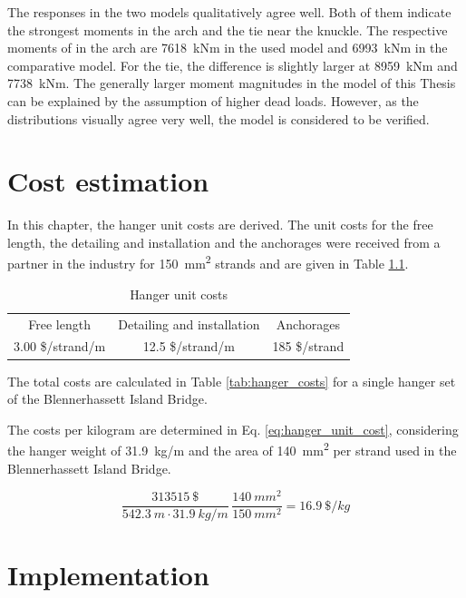 The responses in the two models qualitatively agree well. Both of them indicate the strongest moments in the arch and the tie near the knuckle. The respective moments of in the arch are \SI{7618}{kNm} in the used model and \SI{6993}{kNm} in the comparative model. For the tie, the difference is slightly larger at \SI{8959}{kNm} and \SI{7738}{kNm}. The generally larger moment magnitudes in the model of this Thesis can be explained by the assumption of higher dead loads. However, as the distributions visually agree very well, the model is considered to be verified.


\chapter{Cost estimation}
In this chapter, the hanger unit costs are derived. The unit costs for the free length, the detailing and installation and the anchorages were received from a partner in the industry for \SI{150}{mm^2} strands and are given in Table \ref{tab:hanger_unit}.

\begin{table}[H]
\centering
\begin{tabular}{ccc}
\hline
Free length      & Detailing and installation & Anchorages    \\
3.00 \$/strand/m & 12.5 \$/strand/m           & 185 \$/strand \\ \hline
\end{tabular}
\caption{Hanger unit costs}
\label{tab:hanger_unit}
\end{table}

The total costs are calculated in Table \ref{tab:hanger_costs} for a single hanger set of the Blennerhassett Island Bridge. 



The costs per kilogram are determined in Eq. \ref{eq:hanger_unit_cost}, considering the hanger weight of \SI{31.9}{kg/m} and the area of \SI{140}{mm^2} per strand used in the Blennerhassett Island Bridge.

\begin{equation}
    \frac{\SI{313515}{\$}}{\SI{542.3}{m} \cdot \SI{31.9}{kg/m}} \, \frac{\SI{140}{mm^2}}{\SI{150}{mm^2}}= \SI{16.9}{\$/kg}
    \label{eq:hanger_unit_cost}
\end{equation}

\newpage
\chapter{Implementation}

